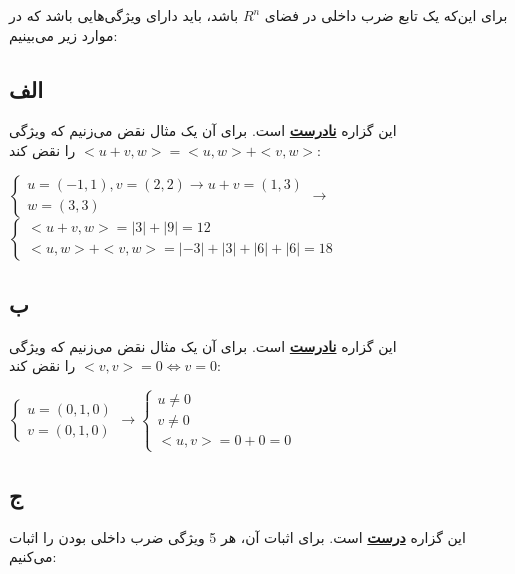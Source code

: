 برای این‌که یک تابع ضرب داخلی در فضای
$R^n$
باشد، باید دارای ویژگی‌هایی باشد که در موارد زیر می‌بینیم:
\subsection*{الف}

این گزاره \underline{\textbf{نادرست}} است.
برای آن یک مثال نقض می‌زنیم که ویژگی 
$<u+v,w>=<u,w>+<v,w>$
را نقض کند:
\setLTR

$\begin{cases}
	
u=(-1,1),v=(2,2) \rightarrow u+v=(1,3)\\

w=(3,3)
\end{cases}\longrightarrow$
$\begin{cases}
<u+v,w>=|3|+|9| = 12 \\
<u,w>+<v,w>=|-3|+|3| + |6|+|6| = 18
\end{cases}$
\setRTL

\subsection*{ب}
این گزاره \underline{\textbf{نادرست}} است.
برای آن یک مثال نقض می‌زنیم که ویژگی 
$<v,v>=0  \Longleftrightarrow v=0$
را نقض کند:

\setLTR
$
\begin{cases}
	u=(0,1,0) \\ v=(0,1,0)
\end{cases}\longrightarrow
\begin{cases}
	u \neq 0 \\ v \neq 0 \\ <u,v> = 0 + 0 = 0
\end{cases}
$
\setRTL

\subsection*{ج}
این گزاره \underline{\textbf{درست}} است.
برای اثبات آن، هر 5 ویژگی ضرب داخلی بودن را اثبات می‌کنیم:

\setLTR

